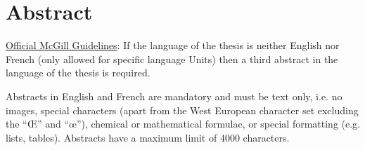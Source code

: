 \chapter*{\rm\bfseries Abstract}
\label{ch:abstraten}

\href{https://www.mcgill.ca/gps/thesis/thesis-guidelines/preparation}{Official McGill Guidelines}: If the language of the thesis is neither English nor French (only allowed for specific language Units) then a third abstract in the language of the thesis is required.

Abstracts in English and French are mandatory and must be text only, i.e. no images, special characters (apart from the West European character set excluding the “Œ” and “œ”), chemical or mathematical formulae, or special formatting (e.g. lists, tables). Abstracts have a maximum limit of 4000 characters.